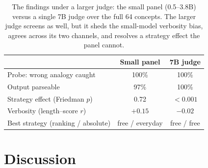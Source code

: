 \documentclass[11pt]{article}
\begin{document}
\begin{table}[t]
\centering
\caption{The findings under a larger judge: the small panel (0.5--3.8B) versus a single 7B judge over
the full 64 concepts. The larger judge screens as well, but it sheds the small-model verbosity
bias, agrees across its two channels, and resolves a strategy effect the panel cannot.}
\label{tab:scale}
\small
\begin{tabular}{lcc}
\toprule
 & Small panel & 7B judge \\
\midrule
Probe: wrong analogy caught       & 100\% & 100\% \\
Output parseable                  & 97\%  & 100\% \\
Strategy effect (Friedman $p$)    & 0.72  & $<0.001$ \\
Verbosity (length--score $r$)     & $+0.15$ & $-0.02$ \\
Best strategy (ranking / absolute)& free / everyday & free / free \\
\bottomrule
\end{tabular}
\end{table}

\section{Discussion}
\label{sec:discussion}
\end{document}
